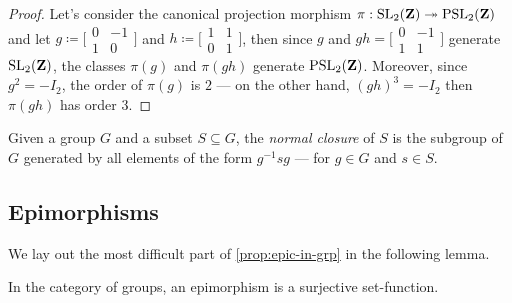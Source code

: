 \begin{proof}
Let's consider the canonical projection morphism
\(\pi: \operatorname{SL}_2(\mathbf{Z}) \twoheadrightarrow \operatorname{PSL}_2(\mathbf{Z})\) and let \(g \coloneq \big[
\begin{smallmatrix}
  0 & -1 \\ 1 & 0
\end{smallmatrix} \big]
\) and \(h \coloneq \big[
\begin{smallmatrix}
  1 & 1 \\ 0 & 1
\end{smallmatrix} \big]\), then since \(g\) and \(g h = \big[
\begin{smallmatrix}
  0 & -1 \\ 1 & 1
\end{smallmatrix} \big]\) generate \(\operatorname{SL}_2(\mathbf{Z})\), the classes \(\pi(g)\) and
\(\pi(gh)\) generate \(\operatorname{PSL}_2(\mathbf{Z})\). Moreover, since \(g^2 = -I_2\), the order
of \(\pi(g)\) is \(2\) --- on the other hand, \((g h)^3 = -I_2\) then
\(\pi(gh)\) has order \(3\).
\end{proof}


\begin{definition}
\label{def:normal-closure}
Given a group \(G\) and a subset \(S \subseteq G\), the \emph{normal closure} of
\(S\) is the subgroup of \(G\) generated by all elements of the form \(g^{-1} s
g\) --- for \(g \in G\) and \(s \in S\).
\end{definition}

\subsection{Epimorphisms}

We lay out the most difficult part of \cref{prop:epic-in-grp} in the following
lemma.

\begin{lemma}
\label{lem:epimorphism-is-surjective-grp}
In the category of groups, an epimorphism is a surjective set-function.
\end{lemma}

